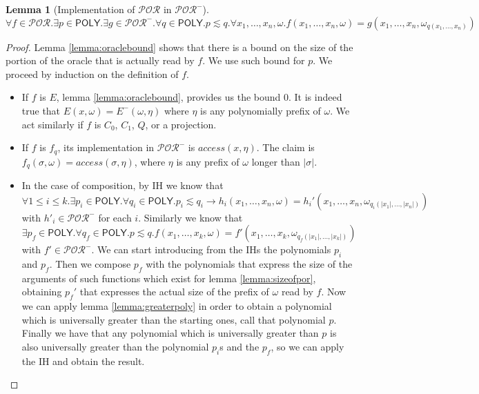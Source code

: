 \documentclass[10pt]{amsart}
\newcommand{\POLY}{\mathsf{POLY}}
\newcommand{\POR}{\mathcal{POR}}
\newcommand{\vone}{x}
\newcommand{\sone}{\sigma}
\newcommand{\oone}{\omega}
\newtheorem{lemma}{Lemma}
\begin{document}
\begin{lemma}[Implementation of $\POR$ in $\POR^-$]
\label{lemma:portopor-}
\small
\[
\forall f \in \POR. \exists p \in \POLY.\exists g \in \POR^-. \forall q \in \POLY. p\lesssim q.\forall \vone_1, \ldots, \vone_n, \oone. f(\vone_1, \ldots, \vone_n, \oone)= g(\vone_1, \ldots, \vone_n, \oone_{q(\vone_1, \ldots, \vone_n)})
\]
\normalsize
\end{lemma}
\begin{proof}
Lemma \ref{lemma:oraclebound} shows that there is a bound on the size of the portion of the oracle that is actually read by $f$. We use such bound for $p$. We proceed by induction on the definition of $f$.
\begin{itemize}
\item If $f$ is $E$, lemma \ref{lemma:oraclebound}, provides us the bound $0$. It is indeed true that $E(\vone, \oone)=E^-(\oone, \eta)$ where $\eta$ is any polynomially prefix of $\oone$. We act similarly if $f$ is $C_0$, $C_1$, $Q$, or a projection.
\item If $f$ is $f_q$, its implementation in $\POR^-$ is $access(\vone, \eta)$. The claim is $f_q(\sone, \oone) = access(\sone, \eta)$, where $\eta$ is any prefix of $\oone$ longer than $|\sone|$.
\item In the case of composition, by IH we know that $\forall 1 \le i\le k. \exists p_i \in \POLY.\forall q_i \in \POLY.p_i \lesssim q_i \to h_i(\vone_1, \ldots, \vone_n, \oone)= h_i'(\vone_1, \ldots, \vone_n, \oone_{q_i(|\vone_1|, \ldots, |\vone_n|)})$ with $h'_i \in \POR^-$ for each $i$. Similarly we know that $\exists p_f \in \POLY.\forall q_f \in \POLY. p \lesssim q. f(\vone_1, \ldots, \vone_k, \oone)= f'(\vone_1, \ldots, \vone_k, \oone_{q_f(|\vone_1|, \ldots, |\vone_k|)})$ with $f' \in \POR^-$. We can start introducing from the IHs the polynomials $p_i$ and $p_f$. Then we compose $p_f$ with the polynomials that express the size of the arguments of such functions which exist for lemma \ref{lemma:sizeofpor}, obtaining $p_f'$ that expresses the actual size of the prefix of $\oone$ read by $f$. Now we can apply lemma \ref{lemma:greaterpoly} in order to obtain a polynomial which is universally greater than the starting ones, call that polynomial $p$. Finally we have that any polynomial which is universally greater than $p$ is also universally greater than the  polynomial $p_i$s and the $p_f$, so we can apply the IH and obtain the result.

\end{itemize}
\end{proof}
\end{document}
